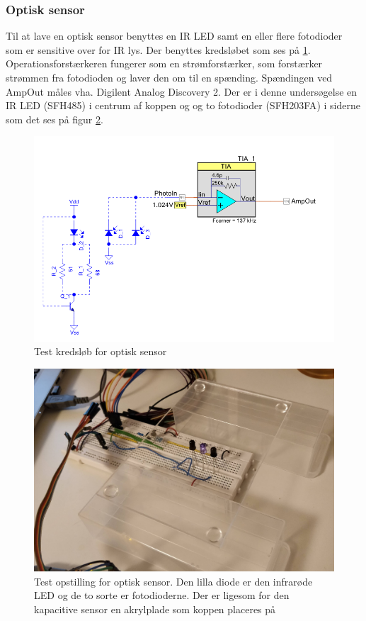 \documentclass[HardwareDesign/HardwareDesign_main.tex]{subfiles}
\begin{document}
\subsubsection{Optisk sensor}
Til at lave en optisk sensor benyttes en IR LED samt en eller flere fotodioder som er sensitive over for IR lys. Der benyttes kredsløbet som ses på \ref{fig:optic_test_diagram}. Operationsforstærkeren fungerer som en strømforstærker, som forstærker strømmen fra fotodioden og laver den om til en spænding. Spændingen ved AmpOut måles vha. Digilent Analog Discovery 2\autocite{AnalogDiscovery2}. Der er i denne undersøgelse en IR LED (SFH485\autocite{SFH485}) i centrum af koppen og og to fotodioder (SFH203FA\autocite{SFH203FA}) i siderne som det ses på figur \ref{fig:optic_opstilling}. 
\begin{figure}[H]
    \centering
    \includegraphics[width=\textwidth]{HardwareDesign/CupSensor/graphics/OpticTest/diagram.PNG}
    \caption{Test kredsløb for optisk sensor}
    \label{fig:optic_test_diagram}
\end{figure}

\begin{figure}[H]
    \centering
    \includegraphics[width=\textwidth]{HardwareDesign/CupSensor/graphics/OpticTest/Optic_testopstillign.jpg}
    \caption{Test opstilling for optisk sensor. Den lilla diode er den infrarøde LED og de to sorte er fotodioderne. Der er ligesom for den kapacitive sensor en akrylplade som koppen placeres på}
    \label{fig:optic_opstilling}
\end{figure}
\end{document}
